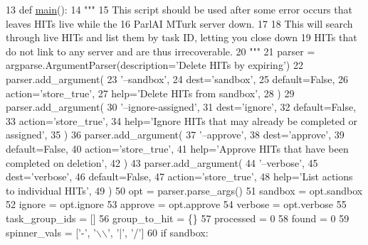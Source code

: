 \begin{DoxyCode}
13 \textcolor{keyword}{def }\hyperlink{namespaceparlai_1_1mturk_1_1scripts_1_1delete__hits_a8dd24ac1eb6692d9295969d598138d05}{main}():
14     \textcolor{stringliteral}{"""}
15 \textcolor{stringliteral}{    This script should be used after some error occurs that leaves HITs live while the}
16 \textcolor{stringliteral}{    ParlAI MTurk server down.}
17 \textcolor{stringliteral}{}
18 \textcolor{stringliteral}{    This will search through live HITs and list them by task ID, letting you close down}
19 \textcolor{stringliteral}{    HITs that do not link to any server and are thus irrecoverable.}
20 \textcolor{stringliteral}{    """}
21     parser = argparse.ArgumentParser(description=\textcolor{stringliteral}{'Delete HITs by expiring'})
22     parser.add\_argument(
23         \textcolor{stringliteral}{'--sandbox'},
24         dest=\textcolor{stringliteral}{'sandbox'},
25         default=\textcolor{keyword}{False},
26         action=\textcolor{stringliteral}{'store\_true'},
27         help=\textcolor{stringliteral}{'Delete HITs from sandbox'},
28     )
29     parser.add\_argument(
30         \textcolor{stringliteral}{'--ignore-assigned'},
31         dest=\textcolor{stringliteral}{'ignore'},
32         default=\textcolor{keyword}{False},
33         action=\textcolor{stringliteral}{'store\_true'},
34         help=\textcolor{stringliteral}{'Ignore HITs that may already be completed or assigned'},
35     )
36     parser.add\_argument(
37         \textcolor{stringliteral}{'--approve'},
38         dest=\textcolor{stringliteral}{'approve'},
39         default=\textcolor{keyword}{False},
40         action=\textcolor{stringliteral}{'store\_true'},
41         help=\textcolor{stringliteral}{'Approve HITs that have been completed on deletion'},
42     )
43     parser.add\_argument(
44         \textcolor{stringliteral}{'--verbose'},
45         dest=\textcolor{stringliteral}{'verbose'},
46         default=\textcolor{keyword}{False},
47         action=\textcolor{stringliteral}{'store\_true'},
48         help=\textcolor{stringliteral}{'List actions to individual HITs'},
49     )
50     opt = parser.parse\_args()
51     sandbox = opt.sandbox
52     ignore = opt.ignore
53     approve = opt.approve
54     verbose = opt.verbose
55     task\_group\_ids = []
56     group\_to\_hit = \{\}
57     processed = 0
58     found = 0
59     spinner\_vals = [\textcolor{stringliteral}{'-'}, \textcolor{stringliteral}{'\(\backslash\)\(\backslash\)'}, \textcolor{stringliteral}{'|'}, \textcolor{stringliteral}{'/'}]
60     \textcolor{keywordflow}{if} sandbox:

\end{DoxyCode}
